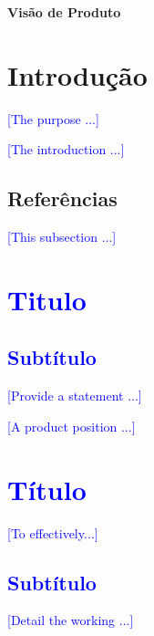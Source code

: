 \begin{center}
    \textbf{\Huge{Visão de Produto}}
\end{center}

\section{Introdução}

\textcolor{blue}{[The purpose ...]}

\textcolor{blue}{[The introduction ...]}

\subsection{Referências}
\textcolor{blue}{[This subsection ...]}

\section{\textcolor{blue}{Titulo}}

\subsection{\textcolor{blue}{Subtítulo}}

\textcolor{blue}{[Provide a statement ...]}

\textcolor{blue}{[A product position ...]}

\section{\textcolor{blue}{Título}}

\textcolor{blue}{[To effectively...]}

\subsection{\textcolor{blue}{Subtítulo}}

\textcolor{blue}{ [Detail the working ...] }
